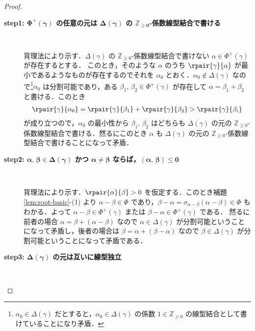\documentclass[rep_main]{subfiles}
\begin{document}
\begin{proof}
	\begin{description}
		\item[\textbf{step1: $\bm{\Phi^+(\gamma)}$ の任意の元は $\bm{\Delta (\gamma)}$ の $\bm{\mathbb{Z}_{\ge 0}}$-係数線型結合で書ける}]　
		
		背理法により示す．$\Delta (\gamma)$ の $\mathbb{Z}_{\ge 0}$-係数線型結合で書けない $\alpha \in \Phi^+(\gamma)$ が存在するとする．
		このとき，そのような $\alpha$ のうち $\rpair{\gamma}{\alpha}$ が最小であるようなものが存在するのでそれを $\alpha_0$ とおく．$\alpha_0 \notin \Delta(\gamma)$ なので\footnote{$\alpha_0 \in \Delta(\gamma)$ だとすると，$\alpha_0 \in \Delta(\gamma)$ の係数 $1 \in \mathbb{Z}_{\ge 0}$ の線型結合として書けていることになり矛盾．}$\alpha_0$ は分割可能であり，ある $\beta_1,\, \beta_2 \in \Phi^+(\gamma)$ が存在して $\alpha = \beta_1 + \beta_2$ と書ける．このとき
		\begin{align}
			\rpair{\gamma}{\alpha_0} = \rpair{\gamma}{\beta_1} + \rpair{\gamma}{\beta_2} > \rpair{\gamma}{\beta_i}
		\end{align}
		が成り立つので，$\alpha_0$ の最小性から $\beta_1,\, \beta_2$ はどちらも $\Delta(\gamma)$ の元の $\mathbb{Z}_{\ge 0}$-係数線型結合で書ける．然るにこのとき $\alpha$ も $\Delta(\gamma)$ の元の $\mathbb{Z}_{\ge 0}$-係数線型結合で書けることになって矛盾．

		\item[\textbf{step2: $\bm{\alpha,\, \beta \in \Delta(\gamma)}$ かつ $\bm{\alpha \neq \beta}$ ならば，$\bm{(\alpha,\, \beta) \le 0}$}]　
		
		背理法により示す．$\rpair{\alpha}{\beta} > 0$ を仮定する．このとき補題\ref{lem:root-basic}-(1) より $\alpha - \beta \in \Phi$ であり，$\beta - \alpha = \sigma_{\alpha-\beta}(\alpha - \beta) \in \Phi$ もわかる．よって $\alpha - \beta \in \Phi^+(\gamma)$ または $\beta - \alpha \in \Phi^+(\gamma)$ である．
		然るに前者の場合 $\alpha = \beta + (\alpha - \beta)$ なので $\alpha \in \Delta(\gamma)$ が分割可能ということになって矛盾し，後者の場合は $\beta = \alpha + (\beta - \alpha)$ なので $\beta \in \Delta(\gamma)$ が分割可能ということになって矛盾である．

		\item[\textbf{step3: $\bm{\Delta(\gamma)}$ の元は互いに線型独立}]　
		

\end{description}
\end{proof}
\end{document}
